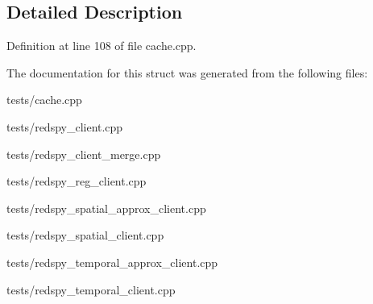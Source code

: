 \subsection{Detailed Description}


Definition at line 108 of file cache.\-cpp.



The documentation for this struct was generated from the following files\-:\begin{DoxyCompactItemize}
\item 
tests/cache.\-cpp\item 
tests/redspy\-\_\-client.\-cpp\item 
tests/redspy\-\_\-client\-\_\-merge.\-cpp\item 
tests/redspy\-\_\-reg\-\_\-client.\-cpp\item 
tests/redspy\-\_\-spatial\-\_\-approx\-\_\-client.\-cpp\item 
tests/redspy\-\_\-spatial\-\_\-client.\-cpp\item 
tests/redspy\-\_\-temporal\-\_\-approx\-\_\-client.\-cpp\item 
tests/redspy\-\_\-temporal\-\_\-client.\-cpp\end{DoxyCompactItemize}
